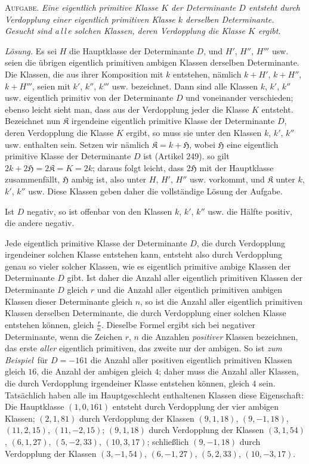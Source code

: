 \textsc{Aufgabe.} \textit{Eine eigentlich primitive Klasse $K$ der Determinante $D$ entsteht durch Verdopplung einer eigentlich primitiven Klasse $k$ derselben Determinante. Gesucht sind a\,l\,l\,e solchen Klassen, deren Verdopplung die Klasse $K$ ergibt.}

\textit{Lösung.} Es sei $H$ die Hauptklasse der Determinante $D$, und $H'$, $H''$, $H'''$ usw. seien die übrigen eigentlich primitiven ambigen Klassen derselben Determinante. Die Klassen, die aus ihrer Komposition mit $k$ entstehen, nämlich $k+H'$, $k+H''$, $k+H'''$, seien mit $k'$, $k''$, $k'''$ usw. bezeichnet. Dann sind alle Klassen $k$, $k'$, $k''$ usw. eigentlich primitiv von der Determinante $D$ und voneinander verschieden; ebenso leicht sieht man, dass aus der Verdopplung jeder die Klasse $K$ entsteht. Bezeichnet nun $\mathfrak{K}$ irgendeine eigentlich primitive Klasse der Determinante $D$, deren Verdopplung die Klasse $K$ ergibt, so muss sie unter den Klassen $k$, $k'$, $k''$ usw. enthalten sein. Setzen wir nämlich $\mathfrak{K}=k+\mathfrak{H}$, wobei $\mathfrak{H}$ eine eigentlich primitive Klasse der Determinante $D$ ist (Artikel 249). so gilt
$2k+2\mathfrak{H}=2\mathfrak{K}=K=2k$; daraus folgt leicht, dass $2\mathfrak{H}$ mit der Hauptklasse zusammenfällt, $\mathfrak{H}$ ambig ist, also unter $H$, $H'$, $H''$ usw. vorkommt, und $\mathfrak{K}$ unter $k$, $k'$, $k''$ usw. Diese Klassen geben daher die vollständige Lösung der Aufgabe.

Ist $D$ negativ, so ist offenbar von den Klassen $k$, $k'$, $k''$ usw. die Hälfte positiv, die andere negativ.

Jede eigentlich primitive Klasse der Determinante $D$, die durch Verdopplung irgendeiner solchen Klasse entstehen kann, entsteht also durch Verdopplung genau so vieler solcher Klassen, wie es eigentlich primitive ambige Klassen der Determinante $D$ gibt. Ist daher die Anzahl aller eigentlich primitiven Klassen der Determinante $D$ gleich $r$ und die Anzahl aller eigentlich primitiven ambigen Klassen dieser Determinante gleich $n$, so ist die Anzahl aller eigentlich primitiven Klassen derselben Determinante, die durch Verdopplung einer solchen Klasse entstehen können, gleich $\frac{r}{n}$. Dieselbe Formel ergibt sich bei negativer Determinante, wenn die Zeichen $r$, $n$ die Anzahlen \textit{positiver} Klassen bezeichnen, das erste \textit{aller} eigentlich primitiven, das zweite nur der ambigen. So ist \textit{zum Beispiel}\ für $D=-161$ die Anzahl aller positiven eigentlich primitiven Klassen gleich $16$, die Anzahl der ambigen gleich $4$; daher muss die Anzahl aller Klassen, die durch Verdopplung irgendeiner Klasse entstehen können, gleich $4$ sein. Tatsächlich haben alle im Hauptgeschlecht enthaltenen Klassen diese Eigenschaft: Die Hauptklasse $(1,0,161)$ entsteht durch Verdopplung der vier ambigen Klassen; $(2,1,81)$ durch Verdopplung der Klassen $(9,1,18)$, $(9,-1,18)$, $(11,2,15)$, $(11,-2,15)$; $(9,1,18)$ durch Verdopplung der Klassen $(3,1,54)$, $(6,1,27)$, $(5,-2,33)$, $(10,3,17)$; schließlich $(9,-1,18)$ durch Verdopplung der Klassen $(3,-1,54)$, $(6,-1,27)$, $(5,2,33)$, $(10,-3,17)$.
